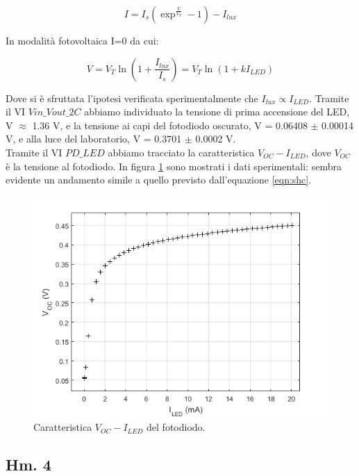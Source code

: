 \documentclass[journal, a4paper]{IEEEtran}
\begin{document}
\begin{equation}
I = I_s (\exp ^{\frac{V}{V_T}}-1)-I_{lux}
\end{equation}
 
In modalità fotovoltaica I=0 da cui:

\begin{equation}
\label{eqn:shc}
V = V_T \ln (1+\frac{I_{lux}}{I_s}) = V_T \ln (1+kI_{LED})
\end{equation} 

Dove si è sfruttata l'ipotesi verificata sperimentalmente che $I_{lux} \propto I_{LED}$. Tramite il VI \texttt{$Vin\_Vout\_2C$} abbiamo individuato la tensione di prima accensione del LED, V $\approx$ 1.36 V, e la tensione ai capi del fotodiodo oscurato, V = 0.06408 $\pm$ 0.00014 V, e alla luce del laboratorio, V = 0.3701 $\pm$ 0.0002 V.\\
Tramite il VI \texttt{$PD\_LED$} abbiamo tracciato la caratteristica $V_{OC}-I_{LED}$, dove $V_{OC}$ è la tensione al fotodiodo. In figura \ref{fig:fotov} sono mostrati i dati sperimentali: sembra evidente un andamento simile a quello previsto dall'equazione \ref{eqn:shc}.

\begin{figure}[htp]
\centering
\includegraphics[scale=.6]{es12_1_6-5_50mis}
\caption{Caratteristica $V_{OC}-I_{LED}$ del fotodiodo.}
\label{fig:fotov}
\end{figure}

\subsection{Hm. 4}
\end{document}
